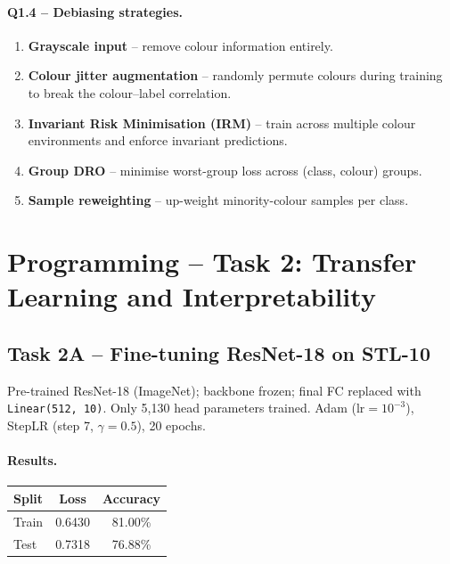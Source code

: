 \documentclass[12pt,a4paper]{article}
\begin{document}
\paragraph{Q1.4 – Debiasing strategies.}
\begin{enumerate}[leftmargin=*, noitemsep]
  \item \textbf{Grayscale input} – remove colour information entirely.
  \item \textbf{Colour jitter augmentation} – randomly permute colours during training to break the colour–label correlation.
  \item \textbf{Invariant Risk Minimisation (IRM)} – train across multiple colour environments and enforce invariant predictions.
  \item \textbf{Group DRO} – minimise worst-group loss across (class, colour) groups.
  \item \textbf{Sample reweighting} – up-weight minority-colour samples per class.
\end{enumerate}

\section{Programming – Task 2: Transfer Learning and Interpretability}

\subsection{Task 2A – Fine-tuning ResNet-18 on STL-10}

Pre-trained ResNet-18 (ImageNet); backbone frozen; final FC replaced with \texttt{Linear(512, 10)}. Only 5{,}130 head parameters trained. Adam ($\text{lr}=10^{-3}$), StepLR (step 7, $\gamma=0.5$), 20 epochs.

\paragraph{Results.}
\begin{center}
\begin{tabular}{lcc}
\toprule
Split & Loss & Accuracy \\
\midrule
Train & 0.6430 & 81.00\% \\
Test  & 0.7318 & 76.88\% \\
\bottomrule
\end{tabular}
\end{center}
\end{document}

